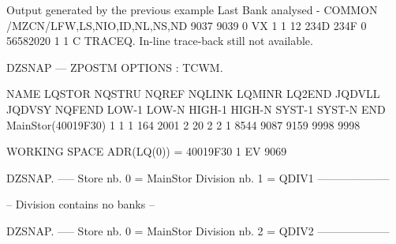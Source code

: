 \begin{Listing}{Output generated by the previous example}
Last Bank analysed - COMMON /MZCN/LFW,LS,NIO,ID,NL,NS,ND
       9037      9039   0  VX         1       1      12
          234D         234F            0     56582020            1            1            C
 TRACEQ.  In-line trace-back still not available.
                                                                                                                                 
DZSNAP --- ZPOSTM                                                                                  OPTIONS : TCWM.               
                                                                                                                                 
  NAME       LQSTOR NQSTRU  NQREF NQLINK LQMINR LQ2END JQDVLL JQDVSY NQFEND  LOW-1  LOW-N HIGH-1 HIGH-N SYST-1 SYST-N    END     
 MainStor(40019F30)      1      1      1    164   2001      2     20      2      2      1   8544   9087   9159   9998   9998     
                                                                                                                                 
 WORKING SPACE   ADR(LQ(0)) = 40019F30                                                                                           
          1    EV        9069                                                                                                    
                                                                                                                                 
DZSNAP.   -----  Store nb. 0 = MainStor Division nb. 1 = QDIV1                       --------------------                        
                                                                                                                                 
         -- Division contains no banks --                                                                                        
                                                                                                                                 
DZSNAP.   -----  Store nb. 0 = MainStor Division nb. 2 = QDIV2                       --------------------                        
                                                                                                                                 

\end{Listing}
